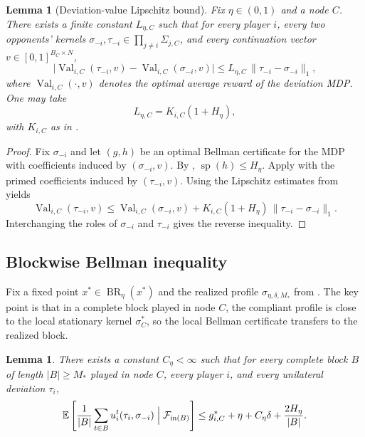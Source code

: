 \documentclass[12pt]{article}
\newtheorem{lemma}[theorem]{Lemma}
\theoremstyle{definition}
\newcommand{\E}{\mathbb{E}}
\newcommand{\1}{\mathbf{1}}
\newcommand{\cF}{\mathcal{F}}
\DeclareMathOperator{\spn}{sp}
\DeclareMathOperator{\BR}{BR}
\begin{document}
\begin{lemma}[Deviation-value Lipschitz bound]
\label{lem:deviation-lipschitz}
Fix $\eta\in(0,1)$ and a node $C$.  There exists a finite constant $L_{\eta,C}$
such that for every player $i$, every two opponents' kernels
$\sigma_{-i},\tau_{-i}\in\prod_{j\ne i}\Sigma_{j,C}$, and every continuation vector
$v\in[0,1]^{B_C\times N}$,
\[
\bigl|\operatorname{Val}_{i,C}(\tau_{-i},v)-\operatorname{Val}_{i,C}(\sigma_{-i},v)\bigr|
\le L_{\eta,C}\,\|\tau_{-i}-\sigma_{-i}\|_1,
\]
where $\operatorname{Val}_{i,C}(\cdot,v)$ denotes the optimal average reward of the
deviation MDP.  One may take
\[
L_{\eta,C}=K_{i,C}(1+H_\eta),
\]
with $K_{i,C}$ as in .
\end{lemma}

\begin{proof}
Fix $\sigma_{-i}$ and let $(g,h)$ be an optimal Bellman certificate for the MDP with
coefficients induced by $(\sigma_{-i},v)$.  By ,
$\spn(h)\le H_\eta$.  Apply  with the primed
coefficients induced by $(\tau_{-i},v)$.  Using the Lipschitz estimates from
 yields
\[
\operatorname{Val}_{i,C}(\tau_{-i},v)
\le
\operatorname{Val}_{i,C}(\sigma_{-i},v)
+
K_{i,C}(1+H_\eta)\,\|\tau_{-i}-\sigma_{-i}\|_1.
\]
Interchanging the roles of $\sigma_{-i}$ and $\tau_{-i}$ gives the reverse
inequality.
\end{proof}

\subsection{Blockwise Bellman inequality}

Fix a fixed point $x^*\in\BR_\eta(x^*)$ and the realized profile
$\sigma_{\eta,\delta,M_*}$ from .  The key point is that in a
complete block played in node $C$, the compliant profile is close to the local
stationary kernel $\sigma_C^*$, so the local Bellman certificate transfers to the
realized block.

\begin{lemma}
\label{lem:block-bellman}
There exists a constant $C_\eta<\infty$ such that for every complete block $B$ of
length $|B|\ge M_*$ played in node $C$, every player $i$, and every unilateral
deviation $\tau_i$,
\begin{equation}
\label{eq:block-bellman-ineq}
\E\left[
\frac1{|B|}\sum_{t\in B}u_i^t(\tau_i,\sigma_{-i})
\Bigm|\cF_{\mathrm{in}(B)}
\right]
\le
 g_{i,C}^* + \eta + C_\eta\delta + \frac{2H_\eta}{|B|}.
\end{equation}
\end{lemma}
\end{document}
